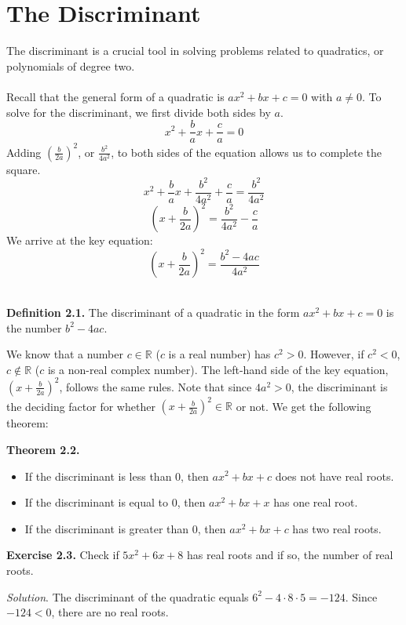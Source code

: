 \documentclass{article}
\begin{document}
\section{The Discriminant}
The discriminant is a crucial tool in solving problems related to quadratics, or polynomials of degree two.\\\\

Recall that the general form of a quadratic is $ax^2+bx+c=0$ with $a\neq0$. To solve for the discriminant, we first divide both sides by $a$. $$x^2+\frac{b}{a}x+\frac{c}{a}=0$$
Adding $(\frac{b}{2a})^2$, or $\frac{b^2}{4a^2}$, to both sides of the equation allows us to complete the square.
$$x^2+\frac{b}{a}x+\frac{b^2}{4a^2}+\frac{c}{a}=\frac{b^2}{4a^2}$$
$$(x+\frac{b}{2a})^2=\frac{b^2}{4a^2}-\frac{c}{a}$$
We arrive at the key equation:
$$(x+\frac{b}{2a})^2=\frac{b^2-4ac}{4a^2}$$\\

\begin{mdframed}
  \textbf{Definition 2.1.} The discriminant of a quadratic in the form $ax^2+bx+c=0$ is the number $b^2-4ac$.
\end{mdframed}

We know that a number $c \in \mathbb{R}$ ($c$ is a real number) has $c^2>0$. However, if $c^2<0$, $c \not\in \mathbb{R}$ ($c$ is a non-real complex number). The left-hand side of the key equation, $(x+\frac{b}{2a})^2$, follows the same rules. Note that since $4a^2 > 0$, the discriminant is the deciding factor for whether $(x+\frac{b}{2a})^2 \in \mathbb{R}$ or not. We get the following theorem:\\

\begin{mdframed}
    \textbf{Theorem 2.2.}
    \begin{itemize}
        \item If the discriminant is less than 0, then $ax^2+bx+c$ does not have real roots.
        \item If the discriminant is equal to 0, then $ax^2+bx+x$ has one real root.
        \item If the discriminant is greater than 0, then $ax^2+bx+c$ has two real roots.
    \end{itemize}
\end{mdframed}

\begin{mdframed}
  \textbf{Exercise 2.3.} Check if $5x^2+6x+8$ has real roots and if so, the number of real roots.
\end{mdframed}
\emph{Solution}. The discriminant of the quadratic equals $6^2-4\cdot8\cdot5 = -124$. Since $-124 < 0$, there are no real roots.
\end{document}
